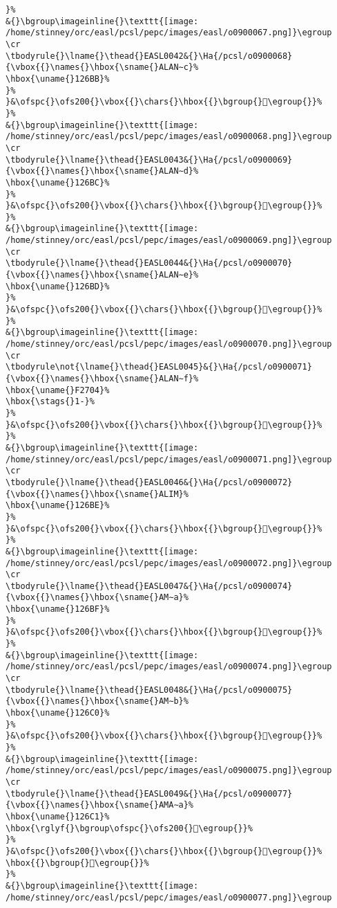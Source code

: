 \begin{verbatim}
}%
&{}\bgroup\imageinline{}\texttt{[image: /home/stinney/orc/easl/pcsl/pepc/images/easl/o0900067.png]}\egroup
\cr
\tbodyrule{}\lname{}\thead{}EASL0042&{}\Ha{/pcsl/o0900068}{\vbox{{}\names{}\hbox{\sname{}ALAN∼c}%
\hbox{\uname{}126BB}%
}%
}&\ofspc{}\ofs200{}\vbox{{}\chars{}\hbox{{}\bgroup{}𒚻\egroup{}}%
}%
&{}\bgroup\imageinline{}\texttt{[image: /home/stinney/orc/easl/pcsl/pepc/images/easl/o0900068.png]}\egroup
\cr
\tbodyrule{}\lname{}\thead{}EASL0043&{}\Ha{/pcsl/o0900069}{\vbox{{}\names{}\hbox{\sname{}ALAN∼d}%
\hbox{\uname{}126BC}%
}%
}&\ofspc{}\ofs200{}\vbox{{}\chars{}\hbox{{}\bgroup{}𒚼\egroup{}}%
}%
&{}\bgroup\imageinline{}\texttt{[image: /home/stinney/orc/easl/pcsl/pepc/images/easl/o0900069.png]}\egroup
\cr
\tbodyrule{}\lname{}\thead{}EASL0044&{}\Ha{/pcsl/o0900070}{\vbox{{}\names{}\hbox{\sname{}ALAN∼e}%
\hbox{\uname{}126BD}%
}%
}&\ofspc{}\ofs200{}\vbox{{}\chars{}\hbox{{}\bgroup{}𒚽\egroup{}}%
}%
&{}\bgroup\imageinline{}\texttt{[image: /home/stinney/orc/easl/pcsl/pepc/images/easl/o0900070.png]}\egroup
\cr
\tbodyrule\not{\lname{}\thead{}EASL0045}&{}\Ha{/pcsl/o0900071}{\vbox{{}\names{}\hbox{\sname{}ALAN∼f}%
\hbox{\uname{}F2704}%
\hbox{\stags{}1-}%
}%
}&\ofspc{}\ofs200{}\vbox{{}\chars{}\hbox{{}\bgroup{}󲜄\egroup{}}%
}%
&{}\bgroup\imageinline{}\texttt{[image: /home/stinney/orc/easl/pcsl/pepc/images/easl/o0900071.png]}\egroup
\cr
\tbodyrule{}\lname{}\thead{}EASL0046&{}\Ha{/pcsl/o0900072}{\vbox{{}\names{}\hbox{\sname{}ALIM}%
\hbox{\uname{}126BE}%
}%
}&\ofspc{}\ofs200{}\vbox{{}\chars{}\hbox{{}\bgroup{}𒚾\egroup{}}%
}%
&{}\bgroup\imageinline{}\texttt{[image: /home/stinney/orc/easl/pcsl/pepc/images/easl/o0900072.png]}\egroup
\cr
\tbodyrule{}\lname{}\thead{}EASL0047&{}\Ha{/pcsl/o0900074}{\vbox{{}\names{}\hbox{\sname{}AM∼a}%
\hbox{\uname{}126BF}%
}%
}&\ofspc{}\ofs200{}\vbox{{}\chars{}\hbox{{}\bgroup{}𒚿\egroup{}}%
}%
&{}\bgroup\imageinline{}\texttt{[image: /home/stinney/orc/easl/pcsl/pepc/images/easl/o0900074.png]}\egroup
\cr
\tbodyrule{}\lname{}\thead{}EASL0048&{}\Ha{/pcsl/o0900075}{\vbox{{}\names{}\hbox{\sname{}AM∼b}%
\hbox{\uname{}126C0}%
}%
}&\ofspc{}\ofs200{}\vbox{{}\chars{}\hbox{{}\bgroup{}𒛀\egroup{}}%
}%
&{}\bgroup\imageinline{}\texttt{[image: /home/stinney/orc/easl/pcsl/pepc/images/easl/o0900075.png]}\egroup
\cr
\tbodyrule{}\lname{}\thead{}EASL0049&{}\Ha{/pcsl/o0900077}{\vbox{{}\names{}\hbox{\sname{}AMA∼a}%
\hbox{\uname{}126C1}%
\hbox{\rglyf{}\bgroup\ofspc{}\ofs200{}𒛁\egroup{}}%
}%
}&\ofspc{}\ofs200{}\vbox{{}\chars{}\hbox{{}\bgroup{}𒛁\egroup{}}%
\hbox{{}\bgroup{}𒛃\egroup{}}%
}%
&{}\bgroup\imageinline{}\texttt{[image: /home/stinney/orc/easl/pcsl/pepc/images/easl/o0900077.png]}\egroup

\end{verbatim}
